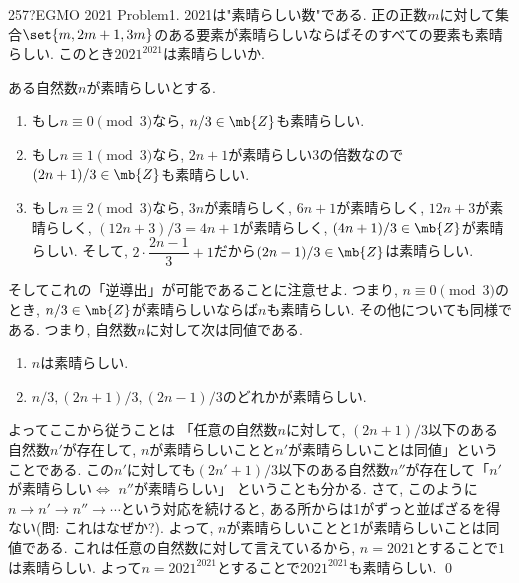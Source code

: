 \begin{prob}{257}{\hosi ?}{EGMO 2021 Problem1.}
2021は"素晴らしい数"である. 正の正数$m$に対して集合$\set{m,2m+1,3m}$のある要素が素晴らしいならばそのすべての要素も素晴らしい. このとき$2021^{2021}$は素晴らしいか.
\end{prob}



ある自然数$n$が素晴らしいとする. \par
\begin{enumerate}
\item もし$n\equiv 0\pmod{3}$なら, $n/3 \in \mb{Z}$も素晴らしい. \\
\item もし$n\equiv 1\pmod{3}$なら, $2n+1$が素晴らしい3の倍数なので $(2n+1)/3\in \mb{Z}$も素晴らしい. \\
\item もし$n\equiv 2\pmod{3}$なら, $3n$が素晴らしく, $6n+1$が素晴らしく, $12n+3$が素晴らしく, $(12n+3)/3 = 4n+1$が素晴らしく, $(4n+1)/3\in \mb{Z}$が素晴らしい. そして, $2\cdot \dfrac{2n-1}{3} + 1$だから$(2n-1)/3\in \mb{Z}$は素晴らしい.
\end{enumerate}
そしてこれの「逆導出」が可能であることに注意せよ. つまり, $n\equiv 0\pmod{3}$のとき, $n/3\in \mb{Z}$が素晴らしいならば$n$も素晴らしい. その他についても同様である. つまり, 自然数$n$に対して次は同値である.
\begin{enumerate}[label=$\bullet$]
\item $n$は素晴らしい.
\item $n/3, (2n+1)/3, (2n-1)/3$のどれかが素晴らしい.
\end{enumerate}
よってここから従うことは 「任意の自然数$n$に対して, $(2n+1)/3$以下のある自然数$n'$が存在して, $n$が素晴らしいことと$n'$が素晴らしいことは同値」ということである. この$ n'$に対しても$(2n'+1)/3$以下のある自然数$n''$が存在して「$n'$が素晴らしい$\iff$ $n''$が素晴らしい」 ということも分かる. さて, このように$n\to n'\to n''\to \cdots $という対応を続けると, ある所からは1がずっと並ばざるを得ない(問: これはなぜか?).  よって, $n$が素晴らしいことと1が素晴らしいことは同値である. これは任意の自然数に対して言えているから, $n=2021$とすることで$1$は素晴らしい. よって$n=2021^{2021}$とすることで$2021^{2021}$も素晴らしい. \qed
